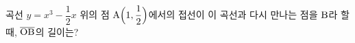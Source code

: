 곡선 $y=x^3-\dfrac{1}{2}x$ 위의 점 $\mathrm{A}\Big(1{,}\mkern3mu\mathopen{}\dfrac{1}{2}\Big)$에서의 접선이 이 곡선과 다시 만나는 점을 $\mathrm{B}$라 할 때, $\overline{\mathrm{OB}}$의 길이는? 
